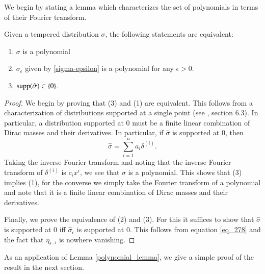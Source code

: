 We begin by stating a lemma which characterizes the set of polynomials in terms of their
 Fourier transform.
\begin{lemma}\label{polynomial_lemma} Given a tempered distribution
  $\sigma$,  the following statements are equivalent:
\begin{enumerate}
\item $\sigma$ is a polynomial 
\item $\sigma_\epsilon$ given by \eqref{sigma-epsilon} is a polynomial for any
  $\epsilon>0$. 
\item $\text{\normalfont supp}(\hat{\sigma})\subset \{0\}$. 
\end{enumerate}
\end{lemma}
\begin{proof}
  We begin by proving that (3) and (1) are equivalent.  This follows
  from a characterization of distributions supported at a single point
  (see \cite{strichartz2003guide}, section 6.3). In particular, a
  distribution supported at $0$ must be a finite linear combination of
  Dirac masses and their derivatives.  In particular, if
  $\hat{\sigma}$ is supported at $0$, then
  \begin{equation}
   \hat{\sigma} = \displaystyle\sum_{i=1}^n a_i\delta^{(i)}.
  \end{equation}
  Taking the inverse Fourier transform and noting that the inverse
  Fourier transform of $\delta^{(i)}$ is $c_ix^i$, we see that
  $\sigma$ is a polynomial. This shows that (3) implies (1), for the
  converse we simply take the Fourier transform of a polynomial and
  note that it is a finite linear combination of Dirac masses and
  their derivatives.
  
  Finally, we prove the equivalence of (2) and (3). For this it
  suffices to show that $\hat{\sigma}$ is supported at $0$ iff
  $\hat{\sigma}_\epsilon$ is supported at $0$. This follows from
  equation \ref{eq_278} and the fact that $\eta_{\epsilon^{-1}}$ is
  nowhere vanishing.
\end{proof}

As an application of Lemma \ref{polynomial_lemma}, we give a
simple proof of the result in the next section.   
